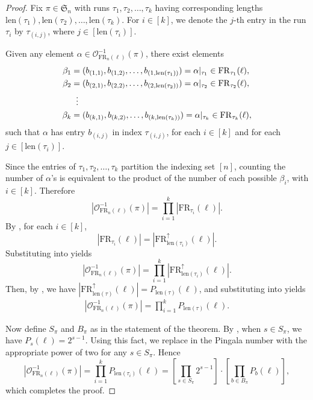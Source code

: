 \documentclass{amsart}
\theoremstyle{definition}
\theoremstyle{definition}
\theoremstyle{remark}
\newcommand{\FR}[1]{\mathrm{FR}_{#1}}
\newcommand{\out}{\mathcal{O}}
\newcommand{\len}{\mathrm{len}}
\newcommand{\Sym}{\mathfrak{S}}
\begin{document}
\begin{proof}
Fix $\pi\in \Sym_n$ with runs $\tau_1,\tau_2,\ldots,\tau_k$ having corresponding lengths $\len(\tau_1), \len(\tau_2),\ldots,\len(\tau_k)$.
For $i\in[k]$, we denote the $j$-th entry in the run $\tau_i$ by 
$\tau_{(i,j)}$, where $j\in [\len(\tau_i)]$.

Given any element 
$\alpha\in\out_{\FR{n}(\ell)}^{-1}(\pi)$, there exist elements 
\begin{align*}
    \beta_1&=(b_{(1,1)},b_{(1,2)},\ldots,b_{(1,\len(\tau_1))})=\alpha|_{\tau_1}\in\FR{\tau_1}(\ell),\\
    \beta_2&=(b_{(2,1)},b_{(2,2)},\ldots,b_{(2,\len(\tau_2))})=\alpha|_{\tau_2}\in\FR{\tau_2}(\ell),\\
    &\hspace{2mm}\vdots\\
    \beta_k&=(b_{(k,1)},b_{(k,2)},\ldots,b_{(k,\len(\tau_k))})=\alpha|_{\tau_k}\in\FR{\tau_k}(\ell),
\end{align*} 
such that $\alpha$ has entry $b_{(i,j)}$ in index $\tau_{(i,j)}$, for each $i\in[k]$ and for each $j\in[\len(\tau_i)]$.

Since the entries of $\tau_1,\tau_2,\ldots,\tau_k$ partition the indexing set $[n]$, counting the number of $\alpha$'s is equivalent to the product of the number of each possible $\beta_i$, with $i\in[k]$.
Therefore
\begin{equation}
    \left|\out_{\FR{n}(\ell)}^{-1}(\pi)\right| = \prod_{i=1}^k |\FR{\tau_i}(\ell)|.\label{AAAA}
\end{equation}
By , for each $i\in[k]$, 
\begin{equation}
    |\FR{\tau_i}(\ell)|=| \FR{\len(\tau_i)}^\uparrow(\ell)|.\label{almost there}
\end{equation}
Substituting  into  yields
\begin{equation}
    \left|\out_{\FR{n}(\ell)}^{-1}(\pi)\right|=\prod_{i=1}^k | \FR{\len(\tau_i)}^\uparrow(\ell)|.\label{almost almost done}
\end{equation}
Then,
by , we have
$|\FR{\len(\tau)}^\uparrow(\ell)| = P_{\len(\tau)}(\ell)$, and substituting into  yields 
\begin{align}
\left|\out_{\FR{n}(\ell)}^{-1}(\pi)\right|=\prod_{i=1}^k P_{\len(\tau)}(\ell).\label{truly we are almost there}
\end{align}

Now define $S_{\pi}$ and $B_\pi$ as in the statement of the theorem. 
By , when $s \in S_\pi$, we have $P_{s}(\ell)=2^{s-1}$. Using this fact, we replace in  the Pingala number with the appropriate power of two for any $s\in S_{\pi}$. Hence 
\[|\out^{-1}_{\FR{n}(\ell)}(\pi)|=\prod_{i=1}^kP_{\len(\tau_i)}(\ell)=\left[\prod_{s\in S_\pi}2^{s-1}\right]\cdot
        \left[\prod_{b\in B_\pi}P_{b}(\ell)\right],\]
which completes the proof.\qedhere
\end{proof}
\end{document}
